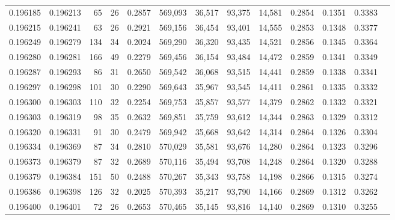 \begin{tabular}{rrrrrrrrrrrrr}
0.196185 & 0.196213 &    65 &  26 &                                     0.2857 & 569,093 &  36,517 &  93,375 &  14,581 & 0.2854 & 0.1351 & 0.3383 \\
0.196215 & 0.196241 &    63 &  26 &                                     0.2921 & 569,156 &  36,454 &  93,401 &  14,555 & 0.2853 & 0.1348 & 0.3377 \\
0.196249 & 0.196279 &   134 &  34 &                                     0.2024 & 569,290 &  36,320 &  93,435 &  14,521 & 0.2856 & 0.1345 & 0.3364 \\
0.196280 & 0.196281 &   166 &  49 &                                     0.2279 & 569,456 &  36,154 &  93,484 &  14,472 & 0.2859 & 0.1341 & 0.3349 \\
0.196287 & 0.196293 &    86 &  31 &                                     0.2650 & 569,542 &  36,068 &  93,515 &  14,441 & 0.2859 & 0.1338 & 0.3341 \\
0.196297 & 0.196298 &   101 &  30 &                                     0.2290 & 569,643 &  35,967 &  93,545 &  14,411 & 0.2861 & 0.1335 & 0.3332 \\
0.196300 & 0.196303 &   110 &  32 &                                     0.2254 & 569,753 &  35,857 &  93,577 &  14,379 & 0.2862 & 0.1332 & 0.3321 \\
0.196303 & 0.196319 &    98 &  35 &                                     0.2632 & 569,851 &  35,759 &  93,612 &  14,344 & 0.2863 & 0.1329 & 0.3312 \\
0.196320 & 0.196331 &    91 &  30 &                                     0.2479 & 569,942 &  35,668 &  93,642 &  14,314 & 0.2864 & 0.1326 & 0.3304 \\
0.196334 & 0.196369 &    87 &  34 &                                     0.2810 & 570,029 &  35,581 &  93,676 &  14,280 & 0.2864 & 0.1323 & 0.3296 \\
0.196373 & 0.196379 &    87 &  32 &                                     0.2689 & 570,116 &  35,494 &  93,708 &  14,248 & 0.2864 & 0.1320 & 0.3288 \\
0.196379 & 0.196384 &   151 &  50 &                                     0.2488 & 570,267 &  35,343 &  93,758 &  14,198 & 0.2866 & 0.1315 & 0.3274 \\
0.196386 & 0.196398 &   126 &  32 &                                     0.2025 & 570,393 &  35,217 &  93,790 &  14,166 & 0.2869 & 0.1312 & 0.3262 \\
0.196400 & 0.196401 &    72 &  26 &                                     0.2653 & 570,465 &  35,145 &  93,816 &  14,140 & 0.2869 & 0.1310 & 0.3255 \\

\end{tabular}
